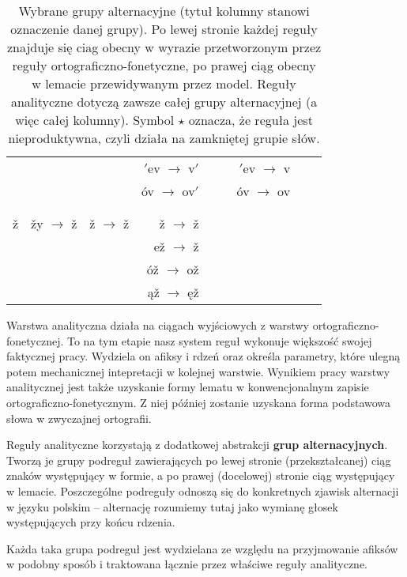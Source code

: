 \documentclass{article}
\begin{document}
\begin{table}
\begin{tabular}{r|rrrrrrrr}
& & & $'$ev $\rightarrow$ v$'$ & & & $'$ev $\rightarrow$ v & \\

& & & óv $\rightarrow$ ov$'$ & & & óv $\rightarrow$ ov & \\

& & & & & \\

& & & & & & & \\
\hline

ž & žy $\rightarrow$ ž & ž $\rightarrow$ ž & ž $\rightarrow$ ž & & & & \\

& & & ež $\rightarrow$ ž & & & & \\

& & & óž $\rightarrow$ ož & & & & \\

& & & ąž $\rightarrow$ ęž & & & & \\
\hline
\end{tabular}
\caption{Wybrane grupy alternacyjne (tytuł kolumny stanowi oznaczenie danej grupy). Po lewej stronie każdej reguły znajduje się ciag obecny w wyrazie przetworzonym przez reguły ortograficzno-fonetyczne, po prawej ciąg obecny w lemacie przewidywanym przez model. Reguły analityczne dotyczą zawsze całej grupy alternacyjnej (a więc całej kolumny). Symbol $\star$ oznacza, że reguła jest nieproduktywna, czyli działa na zamkniętej grupie słów.\label{table:altern}}
\end{table}

Warstwa analityczna działa na ciągach wyjściowych z warstwy ortograficzno-fonetycznej.
To na tym etapie nasz system reguł wykonuje większość swojej faktycznej pracy.
Wydziela on afiksy i rdzeń oraz określa parametry, które ulegną potem mechanicznej intepretacji w kolejnej warstwie.
Wynikiem pracy warstwy analitycznej jest także uzyskanie formy lematu w konwencjonalnym zapisie ortograficzno-fonetycznym. Z niej później zostanie uzyskana forma podstawowa słowa w zwyczajnej ortografii.

Reguły analityczne korzystają z dodatkowej abstrakcji \textbf{grup alternacyjnych}. Tworzą je grupy podreguł zawierających po lewej stronie (przekształcanej) ciąg znaków występujący w formie, a po prawej (docelowej) stronie ciąg występujący w lemacie.
Poszczególne podreguły odnoszą się do konkretnych zjawisk alternacji w języku polskim
-- alternację rozumiemy tutaj jako wymianę głosek występujących przy końcu rdzenia.

Każda taka grupa podreguł jest wydzielana ze względu na przyjmowanie afiksów w podobny sposób i traktowana łącznie przez właściwe reguły analityczne.
\end{document}

